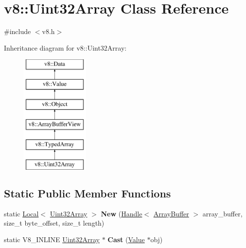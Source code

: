 \hypertarget{classv8_1_1Uint32Array}{\section{v8\-:\-:Uint32\-Array Class Reference}
\label{classv8_1_1Uint32Array}
}


{\ttfamily \#include $<$v8.\-h$>$}

Inheritance diagram for v8\-:\-:Uint32\-Array\-:\begin{figure}[H]
\begin{center}
\leavevmode
\includegraphics[height=6.000000cm]{classv8_1_1Uint32Array}
\end{center}
\end{figure}
\subsection*{Static Public Member Functions}
\begin{DoxyCompactItemize}
\item 
\hypertarget{classv8_1_1Uint32Array_a38de3d179f9a569a91ee9aef4d9f923f}{static \hyperlink{classv8_1_1Local}{Local}$<$ \hyperlink{classv8_1_1Uint32Array}{Uint32\-Array} $>$ {\bfseries New} (\hyperlink{classv8_1_1Handle}{Handle}$<$ \hyperlink{classv8_1_1ArrayBuffer}{Array\-Buffer} $>$ array\-\_\-buffer, size\-\_\-t byte\-\_\-offset, size\-\_\-t length)}\label{classv8_1_1Uint32Array_a38de3d179f9a569a91ee9aef4d9f923f}

\item 
\hypertarget{classv8_1_1Uint32Array_ad40e645ee0abac443dba759ee861de49}{static V8\-\_\-\-I\-N\-L\-I\-N\-E \hyperlink{classv8_1_1Uint32Array}{Uint32\-Array} $\ast$ {\bfseries Cast} (\hyperlink{classv8_1_1Value}{Value} $\ast$obj)}\label{classv8_1_1Uint32Array_ad40e645ee0abac443dba759ee861de49}

\end{DoxyCompactItemize}

